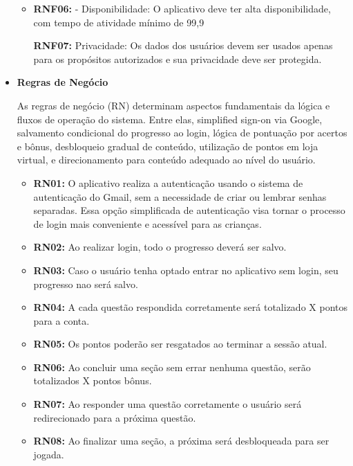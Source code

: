 \begin{itemize}
\begin{itemize}
        \item \textbf{RNF06:} - Disponibilidade: O aplicativo deve ter alta disponibilidade, com tempo de atividade mínimo de 99,9%

        \textbf{RNF07:}  Privacidade: Os dados dos usuários devem ser usados apenas para os propósitos autorizados e sua privacidade deve ser protegida.
    \end{itemize}    
    \item \textbf{Regras de Negócio}

    As regras de negócio (RN) determinam aspectos fundamentais da lógica e fluxos de operação do sistema. Entre elas, simplified sign-on via Google, salvamento condicional do progresso ao login, lógica de pontuação por acertos e bônus, desbloqueio gradual de conteúdo, utilização de pontos em loja virtual, e direcionamento para conteúdo adequado ao nível do usuário.
    \begin{itemize}
        
        \item \textbf{RN01:} O aplicativo realiza a autenticação usando o sistema de autenticação do Gmail, sem a necessidade de criar ou lembrar senhas separadas. Essa opção simplificada de autenticação visa tornar o processo de login mais conveniente e acessível para as crianças.

        \item \textbf{RN02:} Ao realizar login, todo o progresso deverá ser salvo.

        \item \textbf{RN03:} Caso o usuário tenha optado entrar no aplicativo sem login, seu progresso nao será salvo.

        \item \textbf{RN04:} A cada questão respondida corretamente será totalizado X pontos para a conta.  

        \item \textbf{RN05:} Os pontos poderão ser resgatados ao terminar a sessão atual.

        \item \textbf{RN06:} Ao concluir uma seção sem errar nenhuma questão, serão totalizados X pontos bônus.

        \item \textbf{RN07:} Ao responder uma questão corretamente o usuário será redirecionado para a próxima questão.

        \item \textbf{RN08:} Ao finalizar uma seção, a próxima será desbloqueada para ser jogada.


\end{itemize}
\end{itemize}
